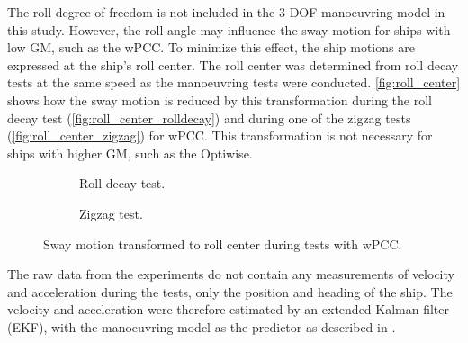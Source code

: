 \noindent The roll degree of freedom is not included in the 3 DOF manoeuvring model in this study. However, the roll angle may influence the sway motion for ships with low GM, such as the wPCC. To minimize this effect, the ship motions are expressed at the ship's roll center. The roll center was determined from roll decay tests at the same speed as the manoeuvring tests were conducted. \autoref{fig:roll_center} shows how the sway motion is reduced by this transformation during the roll decay test (\autoref{fig:roll_center_rolldecay}) and during one of the zigzag tests (\autoref{fig:roll_center_zigzag}) for wPCC. This transformation is not necessary for ships with higher GM, such as the Optiwise.
\begin{figure}[h]
     \centering
     \begin{subfigure}[b]{0.49\textwidth}
         \centering
         
        \caption{Roll decay test.}
        \label{fig:roll_center_rolldecay}
     \end{subfigure}
     \hfill
     \begin{subfigure}[b]{0.49\textwidth}
        \centering
        
        \caption{Zigzag test.}
        \label{fig:roll_center_zigzag}
     \end{subfigure}
        \caption{Sway motion transformed to roll center during tests with wPCC.}
        \label{fig:roll_center}
\end{figure}

The raw data from the experiments do not contain any measurements of velocity and acceleration during the tests, only the position and heading of the ship. The velocity and acceleration were therefore estimated by an extended Kalman filter (EKF), with the manoeuvring model as the predictor as described in \citet{alexanderssonSystemIdentificationVessel2022}.

